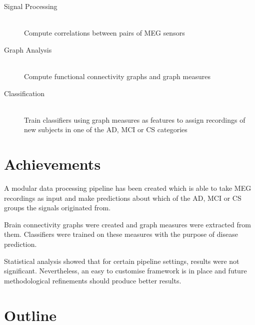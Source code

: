 \begin{description}
\item[Signal Processing] \hfill \\
  Compute correlations between pairs of \ac{MEG} sensors
  \item[Graph Analysis] \hfill \\
  Compute functional connectivity graphs and graph measures
  \item[Classification] \hfill \\
  Train classifiers using graph measures as features to assign recordings of new subjects in one of the \ac{AD}, \ac{MCI} or \ac{CS} categories
\end{description}

\section{Achievements}

A modular data processing pipeline has been created which is able to take \ac{MEG} recordings as input and make predictions about which of the \ac{AD}, \ac{MCI} or \ac{CS} groups the signals originated from.

Brain connectivity graphs were created and graph measures were extracted from them. Classifiers were trained on these measures with the purpose of disease prediction.

Statistical analysis showed that for certain pipeline settings, results were not significant. Nevertheless, an easy to customise framework is in place and future methodological refinements should produce better results.


\section{Outline}


